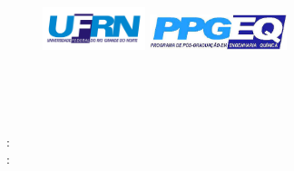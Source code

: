 \documentclass[
	12pt,			%
	openany,			%
	oneside,			%
	a4paper,			%
	english,			%
	french,				%
	spanish,			%
	brazil				%
	]{abntex2}
\begin{document}


\thispagestyle{empty}

\begin{center}
	\begin{figure}[!htb]
		\centering
		\includegraphics[width=3cm]{Figuras/ufrn.jpg}
		\hspace*{\fill}
		\includegraphics[width=4cm]{Figuras/ppgeq.jpg}
	\end{figure}
	\imprimirinstituicao \\
	\vspace*{\fill} 
	\imprimirtipotrabalho\\
	\vspace*{\fill} 
	\begin{center}
		\ABNTEXchapterfont\bfseries\large\imprimirtitulo
	\end{center}
	\vspace*{\fill} 
	\imprimirautor \\
	\vspace*{\fill} 
	\imprimirorientadorRotulo: \imprimirorientador \\
	\imprimircoorientadorRotulo: \imprimircoorientador \\
	\vspace*{\fill}
	\begin{center}
		\vspace*{0.5cm}
		{\normalsize\imprimirlocal}
		\par
		{\normalsize\imprimirdata}
		\vspace*{1cm}
	\end{center}
\end{center}
\newpage
\end{document}
